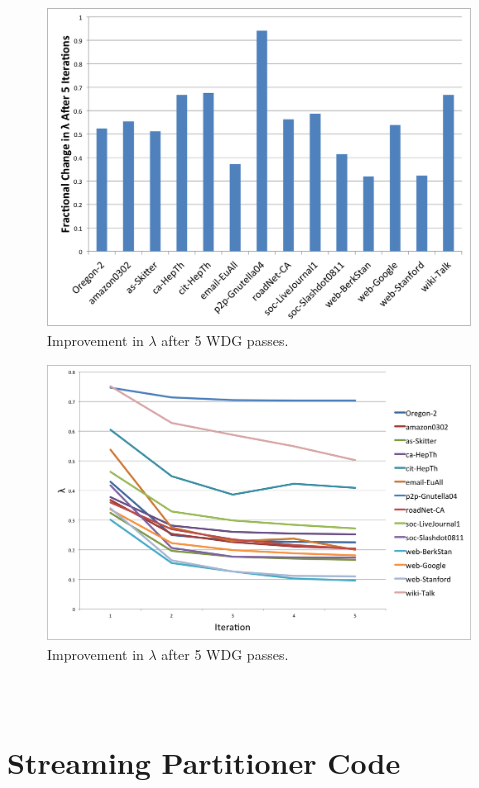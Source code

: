 \documentclass[11pt]{article}
\begin{document}
\begin{figure}[ht]
\centering
\includegraphics[scale=0.7] {figures/fracLambda.png}
\caption[Caption for]{Improvement in $\lambda$ after 5 WDG passes.}
\end{figure}

\begin{figure}[ht]
\centering
\includegraphics[scale=0.5] {figures/line_plot_lambda}
\caption[Caption for]{Improvement in $\lambda$ after 5 WDG passes.}
\end{figure}






\newpage
\appendix
\section{\\Streaming Partitioner Code} \label{App:AppendixA}
\end{document}
